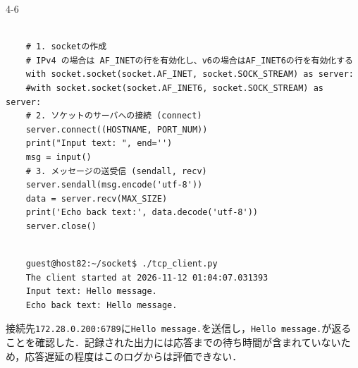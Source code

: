 \begin{maintask}{4-6}
\begin{listing}[H]
\begin{verbatim}
                                                                                                              
    # 1. socketの作成
    # IPv4 の場合は AF_INETの行を有効化し、v6の場合はAF_INET6の行を有効化する
    with socket.socket(socket.AF_INET, socket.SOCK_STREAM) as server:
    #with socket.socket(socket.AF_INET6, socket.SOCK_STREAM) as server:
    # 2. ソケットのサーバへの接続 (connect)
    server.connect((HOSTNAME, PORT_NUM))                                                                      
    print("Input text: ", end='')
    msg = input()
    # 3. メッセージの送受信 (sendall, recv)
    server.sendall(msg.encode('utf-8'))
    data = server.recv(MAX_SIZE)                                                                              
    print('Echo back text:', data.decode('utf-8'))
    server.close()                                                                                            
                          
    \end{verbatim}
  \end{listing}
  \begin{termout}[H]
    \caption{TCPポート6789への接続結果}\label{out:tcp_busy_client}
    \begin{verbatim}
    guest@host82:~/socket$ ./tcp_client.py                                                                        
    The client started at 2026-11-12 01:04:07.031393                                                              
    Input text: Hello message.                                                                                    
    Echo back text: Hello message.     
    \end{verbatim}
  \end{termout}

  接続先\texttt{172.28.0.200:6789}に\texttt{Hello message.}を送信し，\texttt{Hello message.}が返ることを確認した．記録された出力には応答までの待ち時間が含まれていないため，応答遅延の程度はこのログからは評価できない．
\end{maintask}
